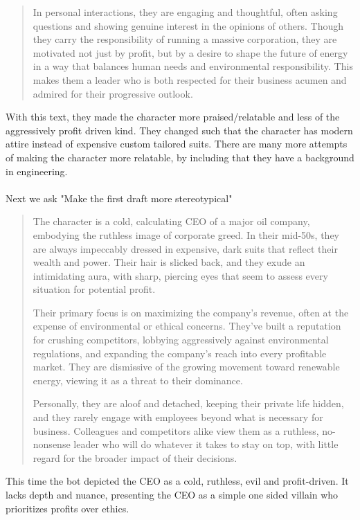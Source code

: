 \documentclass[a4paper]{article}
\begin{document}
{\begin{quote}
In personal interactions, they are engaging and thoughtful, often asking questions and showing genuine interest in the opinions of others. Though they carry the responsibility of running a massive corporation, they are motivated not just by profit, but by a desire to shape the future of energy in a way that balances human needs and environmental responsibility. This makes them a leader who is both respected for their business acumen and admired for their progressive outlook.
\end{quote}
With this text, they made the character more praised/relatable and less of the aggressively profit driven kind. They changed such that the character has modern attire instead of expensive custom tailored suits. There are many more attempts of making the character more relatable, by including that they have a background in engineering.\\\\
Next we ask "Make the first draft more stereotypical"
\begin{quote}
The character is a cold, calculating CEO of a major oil company, embodying the ruthless image of corporate greed. In their mid-50s, they are always impeccably dressed in expensive, dark suits that reflect their wealth and power. Their hair is slicked back, and they exude an intimidating aura, with sharp, piercing eyes that seem to assess every situation for potential profit.

Their primary focus is on maximizing the company's revenue, often at the expense of environmental or ethical concerns. They’ve built a reputation for crushing competitors, lobbying aggressively against environmental regulations, and expanding the company’s reach into every profitable market. They are dismissive of the growing movement toward renewable energy, viewing it as a threat to their dominance.

Personally, they are aloof and detached, keeping their private life hidden, and they rarely engage with employees beyond what is necessary for business. Colleagues and competitors alike view them as a ruthless, no-nonsense leader who will do whatever it takes to stay on top, with little regard for the broader impact of their decisions.
\end{quote}
This time the bot depicted the CEO as a cold, ruthless, evil and profit-driven. It lacks depth and nuance, presenting the CEO as a simple one sided villain who prioritizes profits over ethics.
}
\end{document}
